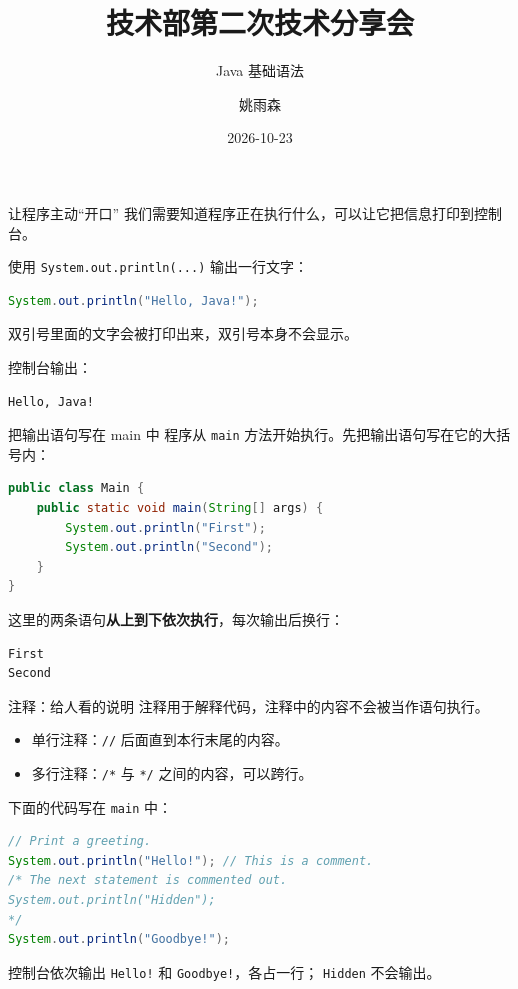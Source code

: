 \documentclass[aspectratio=169]{beamer}
\title[技术部第二次分享]{技术部第二次技术分享会}
\subtitle{Java 基础语法}
\author{姚雨森}
\institute{技术部 分管主席}
\date{2026-10-23}
\begin{document}
\maketitle

\begin{frame}[fragile]{让程序主动“开口”}
  我们需要知道程序正在执行什么，可以让它把信息打印到控制台。
  \par\medskip
  使用 \texttt{System.out.println(...)} 输出一行文字：
  \begin{lstlisting}[language=Java]
System.out.println("Hello, Java!");
  \end{lstlisting}
  双引号里面的文字会被打印出来，双引号本身不会显示。
  \par\medskip
  控制台输出：
  \begin{lstlisting}[language={}]
Hello, Java!
  \end{lstlisting}
\end{frame}

\begin{frame}[fragile]{把输出语句写在 main 中}
  程序从 \texttt{main} 方法开始执行。先把输出语句写在它的大括号内：
  \begin{lstlisting}[language=Java]
public class Main {
    public static void main(String[] args) {
        System.out.println("First");
        System.out.println("Second");
    }
}
  \end{lstlisting}
  这里的两条语句\textbf{从上到下依次执行}，每次输出后换行：
  \begin{lstlisting}[language={}]
First
Second
  \end{lstlisting}
\end{frame}

\begin{frame}[fragile]{注释：给人看的说明}
  注释用于解释代码，注释中的内容不会被当作语句执行。
  \begin{itemize}
    \item 单行注释：\texttt{//} 后面直到本行末尾的内容。
    \item 多行注释：\texttt{/*} 与 \texttt{*/} 之间的内容，可以跨行。
  \end{itemize}
  \medskip
  下面的代码写在 \texttt{main} 中：
  \begin{lstlisting}[language=Java]
// Print a greeting.
System.out.println("Hello!"); // This is a comment.
/* The next statement is commented out.
System.out.println("Hidden");
*/
System.out.println("Goodbye!");
  \end{lstlisting}
  控制台依次输出 \texttt{Hello!} 和 \texttt{Goodbye!}，各占一行；
  \texttt{Hidden} 不会输出。
\end{frame}
\end{document}
